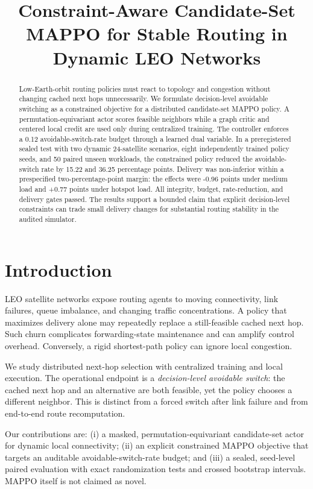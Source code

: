 \documentclass[conference]{IEEEtran}
\title{Constraint-Aware Candidate-Set MAPPO for Stable Routing in Dynamic LEO Networks}
\author{\IEEEauthorblockN{Author information to be inserted before submission}}
\begin{document}
\maketitle

\begin{abstract}
Low-Earth-orbit routing policies must react to topology and congestion without
changing cached next hops unnecessarily. We formulate decision-level avoidable
switching as a constrained objective for a distributed candidate-set MAPPO
policy. A permutation-equivariant actor scores feasible neighbors while a
graph critic and centered local credit are used only during centralized
training. The controller enforces a 0.12 avoidable-switch-rate budget through
a learned dual variable. In a preregistered sealed test with two dynamic
24-satellite scenarios, eight independently trained policy seeds, and 50
paired unseen workloads, the constrained policy reduced the avoidable-switch
rate by 15.22 and 36.25 percentage points. Delivery was non-inferior within a
prespecified two-percentage-point margin: the effects were -0.96 points under
medium load and +0.77 points under hotspot load. All integrity, budget,
rate-reduction, and delivery gates passed. The results support a bounded claim
that explicit decision-level constraints can trade small delivery changes for
substantial routing stability in the audited simulator.
\end{abstract}

\section{Introduction}
LEO satellite networks expose routing agents to moving connectivity, link
failures, queue imbalance, and changing traffic concentrations. A policy that
maximizes delivery alone may repeatedly replace a still-feasible cached next
hop. Such churn complicates forwarding-state maintenance and can amplify
control overhead. Conversely, a rigid shortest-path policy can ignore local
congestion.

We study distributed next-hop selection with centralized training and local
execution. The operational endpoint is a \emph{decision-level avoidable
switch}: the cached next hop and an alternative are both feasible, yet the
policy chooses a different neighbor. This is distinct from a forced switch
after link failure and from end-to-end route recomputation.

Our contributions are: (i) a masked, permutation-equivariant candidate-set
actor for dynamic local connectivity; (ii) an explicit constrained MAPPO
objective that targets an auditable avoidable-switch-rate budget; and (iii) a
sealed, seed-level paired evaluation with exact randomization tests and crossed
bootstrap intervals. MAPPO itself is not claimed as novel.
\end{document}
